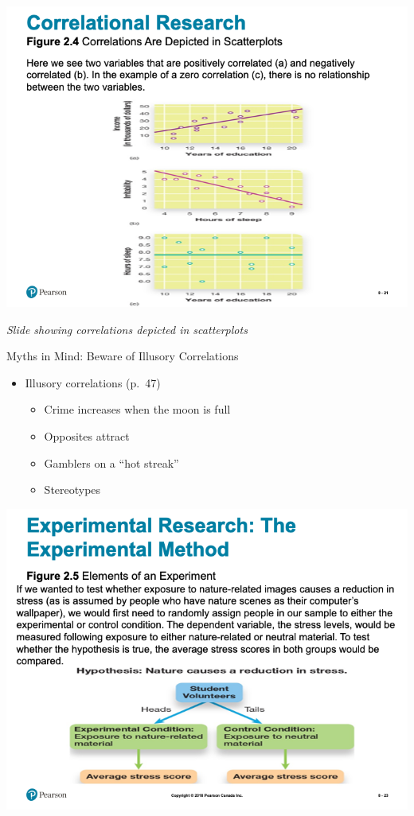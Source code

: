 \documentclass[
]{book}
\providecommand{\tightlist}{%
  \setlength{\itemsep}{0pt}\setlength{\parskip}{0pt}}
\begin{document}
\includegraphics{assets/unit_1/slide_21.png}

\emph{Slide showing correlations depicted in scatterplots}

Myths in Mind: Beware of Illusory Correlations

\begin{itemize}
\tightlist
\item
  Illusory correlations (p.~47)

  \begin{itemize}
  \tightlist
  \item
    Crime increases when the moon is full\\
  \item
    Opposites attract\\
  \item
    Gamblers on a ``hot streak''\\
  \item
    Stereotypes
  \end{itemize}
\end{itemize}

\includegraphics{assets/unit_1/slide_23.png}
\end{document}

